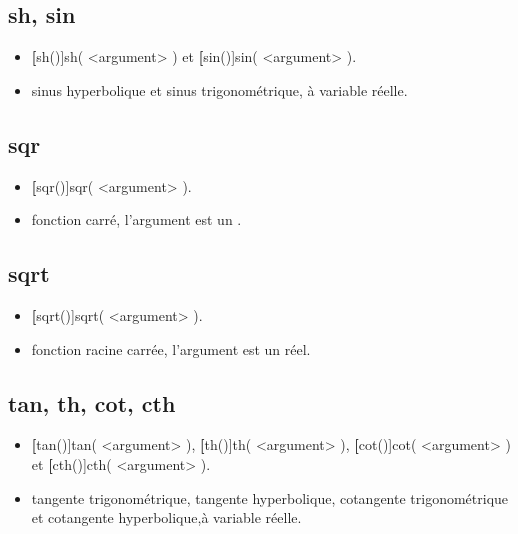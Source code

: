 \subsection{sh, sin}

\begin{itemize}
 \item \util \textbf[sh()]{sh( <argument> )} et \textbf[sin()]{sin( <argument> )}.
 \item \desc  sinus hyperbolique et sinus trigonométrique, à variable réelle.
\end{itemize}

\subsection{sqr}

\begin{itemize}
 \item \util \textbf[sqr()]{sqr( <argument> )}.
 \item \desc fonction carré, l'argument est un .
\end{itemize}

\subsection{sqrt}

\begin{itemize}
 \item \util \textbf[sqrt()]{sqrt( <argument> )}.
 \item \desc fonction racine carrée, l'argument est un réel.
\end{itemize} 

\subsection{tan, th, cot, cth}

\begin{itemize}
 \item \util \textbf[tan()]{tan( <argument> )}, \textbf[th()]{th( <argument> )}, \textbf[cot()]{cot( <argument> )} et
\textbf[cth()]{cth( <argument> )}.
 \item \desc tangente trigonométrique, tangente hyperbolique, cotangente trigonométrique et cotangente hyperbolique,à variable réelle.
\end{itemize}
